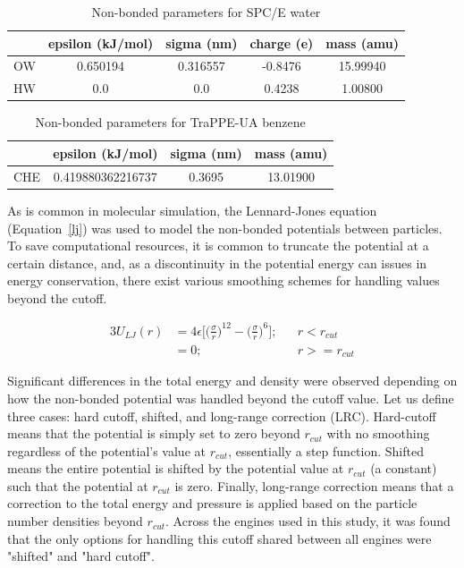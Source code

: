 \begin{table}
\caption{Non-bonded parameters for SPC/E water} \label{tab:water}
\centering
\begin{tabular}{lcccc}
   & epsilon (kJ/mol) & sigma (nm) & charge (e) & mass (amu) \\ \hline
OW & 0.650194         & 0.316557   & -0.8476    &  15.99940  \\ 
HW & 0.0              & 0.0        &  0.4238    &  1.00800   \\
\end{tabular}
\end{table}

\begin{table}
\caption{Non-bonded parameters for TraPPE-UA benzene} \label{tab:bz_nonbond}
\centering
\begin{tabular}{lccc}
    & epsilon (kJ/mol)  & sigma (nm) & mass (amu) \\ \hline
CHE & 0.419880362216737 & 0.3695     &  13.01900  \\
\end{tabular}
\end{table}

As is common in molecular simulation, the Lennard-Jones equation (Equation~\eqref{lj}) was used to model the non-bonded potentials between particles.
To save computational resources, it is common to truncate the potential at a certain distance, and, as a discontinuity in the potential energy can issues in energy conservation, there exist various smoothing schemes for handling values beyond the cutoff.

\begin{alignat}{3}
U_{LJ}(r) & = 4\epsilon\bigg[\bigg(\frac{\sigma}{r}\bigg)^{12} - \bigg(\frac{\sigma}{r}\bigg)^{6}\bigg]; && r<r_{cut} 
    \label{lj} \\
& = 0; && r>=r_{cut}
    \nonumber
\end{alignat}

Significant differences in the total energy and density were observed depending on how the non-bonded potential was handled beyond the cutoff value.
Let us define three cases: hard cutoff, shifted, and long-range correction (LRC). 
Hard-cutoff means that the potential is simply set to zero beyond $r_{cut}$ with no smoothing regardless of the potential’s value at $r_{cut}$, essentially a step function.
Shifted means the entire potential is shifted by the potential value at $r_{cut}$ (a constant) such that the potential at $r_{cut}$ is zero.
Finally, long-range correction means that a correction to the total energy and pressure is applied based on the particle number densities beyond $r_{cut}$.
Across the engines used in this study, it was found that the only options for handling this cutoff shared between all engines were "shifted" and "hard cutoff".

